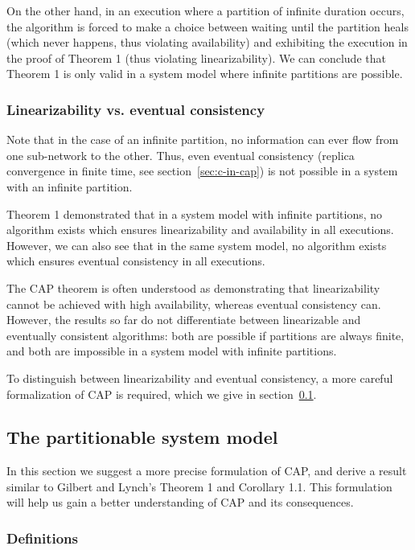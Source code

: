 \documentclass[fleqn,12pt,lineno]{wlpeerj} %
\begin{document}
On the other hand, in an execution where a partition of infinite duration occurs, the algorithm is
forced to make a choice between waiting until the partition heals (which never happens, thus
violating availability) and exhibiting the execution in the proof of Theorem 1 (thus violating
linearizability). We can conclude that Theorem 1 is only valid in a system model where infinite
partitions are possible.

\subsubsection{Linearizability vs. eventual consistency}

Note that in the case of an infinite partition, no information can ever flow from one sub-network to
the other. Thus, even eventual consistency (replica convergence in finite time, see
section~\ref{sec:c-in-cap}) is not possible in a system with an infinite partition.

Theorem 1 demonstrated that in a system model with infinite partitions, no algorithm exists which
ensures linearizability and availability in all executions. However, we can also see that in the
same system model, no algorithm exists which ensures eventual consistency in all executions.

The CAP theorem is often understood as demonstrating that linearizability cannot be achieved with
high availability, whereas eventual consistency can. However, the results so far do not
differentiate between linearizable and eventually consistent algorithms: both are possible if
partitions are always finite, and both are impossible in a system model with infinite partitions.

To distinguish between linearizability and eventual consistency, a more careful formalization of CAP
is required, which we give in section~\ref{sec:partitionable-model}.

\subsection{The partitionable system model}\label{sec:partitionable-model}

In this section we suggest a more precise formulation of CAP, and derive a result similar to Gilbert
and Lynch's Theorem 1 and Corollary 1.1. This formulation will help us gain a better understanding
of CAP and its consequences.

\subsubsection{Definitions}
\end{document}
